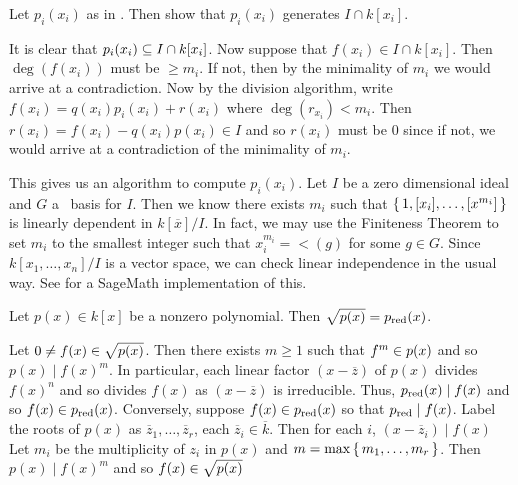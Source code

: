 \documentclass[letterpaper, 11pt, oneside]{book}
\begin{document}
\begin{exercise}\label{ex:UAG_2.2.2}
  Let $p_{i}(x_{i})$ as in \cite[2.2 (2.6)]{book:UAG}.
  Then show that $p_{i}(x_{i})$ generates $I \cap k[x_{i}]$.
\end{exercise}
\begin{pf}
  It is clear that $\ideal{p_{i}(x_{i})} \subseteq I \cap k[x_{i}]$.
  Now suppose that $f(x_{i}) \in I \cap k[x_{i}]$.
  Then $\deg(f(x_{i}))$ must be $\geq m_{i}$.
  If not, then by the minimality of $m_{i}$ we would arrive at a contradiction.
  Now by the division algorithm, write $f(x_{i}) = q(x_{i})p_{i}(x_{i}) + r(x_{i})$ where $\deg(r_{x_{i}}) < m_{i}$.
  Then $r(x_{i}) = f(x_{i}) - q(x_{i})p(x_{i}) \in I$ and so $r(x_{i})$ must be $0$ since if not, we would arrive at a contradiction of the minimality of $m_{i}$.

  This gives us an algorithm to compute $p_{i}(x_{i})$.
  Let $I$ be a zero dimensional ideal and $G$ a \Grobner\ basis for $I$.
  Then we know there exists $m_{i}$ such that $\set{1, [x_{i}], \ldots, [x^{m_{i}}]}$ is linearly dependent in $k[\overline{x}] / I$.
  In fact, we may use the Finiteness Theorem to set $m_{i}$ to the smallest integer such that $x_{i}^{m_{i}} = \lt(g)$ for some $g \in G$.
  Since $k[x_{1}, \ldots, x_{n}] / I$ is a vector space, we can check linear independence in the usual way.
  See  for a SageMath implementation of this.
\end{pf}

\begin{exercise}\label{ex:UAG_2.2.3}
  Let $p(x) \in k[x]$ be a nonzero polynomial.
  Then $\sqrt{\gen{p(x)}} = \gen{p_{\red}(x)}$.
\end{exercise}
\begin{pf}
  Let $0 \neq f(x) \in \sqrt{\gen{p(x)}}$.
  Then there exists $m \geq 1$ such that $f^{m} \in \gen{p(x)}$ and so $p(x) \mid f(x)^{m}$.
  In particular, each linear factor $(x - \overline{z})$ of $p(x)$ divides $f(x)^{n}$ and so divides $f(x)$ as $(x - \overline{z})$ is irreducible.
  Thus, $p_{\operatorname{red}}(x) \mid f(x)$ and so $f(x) \in \gen{p_{\red}(x)}$.
  Conversely, suppose $f(x) \in \gen{p_{\red}(x)}$ so that $\gen{p_{\red}} \mid f(x)$.
  Label the roots of $p(x)$ as $\overline{z}_{1}, \ldots, \overline{z}_{r}$, each $\overline{z}_{i} \in \overline{k}$.
  Then for each $i$, $(x - \overline{z}_{i}) \mid f(x)$
  Let $m_{i}$ be the multiplicity of $z_{i}$ in $p(x)$ and $m = \max\set{m_{1}, \ldots, m_{r}}$.
  Then $p(x) \mid f(x)^{m}$ and so $f(x) \in \sqrt{\gen{p(x)}}$
\end{pf}
\end{document}

